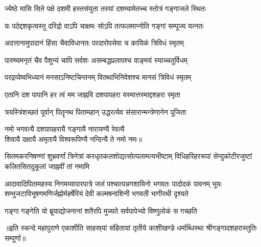 \twolineshloka
{ज्येष्ठे मासि सिते पक्षे दशमी हस्तसंयुता}%
{तस्यां दशम्यामेतच्च स्तोत्रं गङ्गाजले स्थितः}

\twolineshloka
{यः पठेद्दशकृत्वस्तु दरिद्रो वाऽपि चाक्षमः}%
{सोऽपि तत्फलमाप्नोति गङ्गां सम्पूज्य यत्नतः}

\twolineshloka
{अदत्तानामुपादानं हिंसा चैवाविधानतः}%
{परदारोपसेवा च कायिकं त्रिविधं स्मृतम्}

\twolineshloka
{पारुष्यमनृतं चैव पैशुन्यं चापि सर्वशः}%
{असम्बद्धप्रलापश्च वाङ्मयं स्याच्चतुर्विधम्}

\twolineshloka
{परद्रव्येष्वभिध्यानं मनसाऽनिष्टचिन्तनम्}%
{वितथाभिनिवेशश्च मानसं त्रिविधं स्मृतम्}

\twolineshloka
{एतानि दश पापानि हर त्वं मम जाह्नवि}%
{दशपापहरा यस्मात्तस्माद्दशहरा स्मृता}

\twolineshloka
{त्रयस्त्रिंशच्छतं पूर्वान् पितॄनथ पितामहान्}%
{उद्धरत्येव संसारान्मन्त्रेणानेन पूजिता}%


{नमो भगवत्यै दशपापहरायै गङ्गायै नारायण्यै रेवत्यै}\\
{शिवायै दक्षायै अमृतायै विश्वरूपिण्यै नन्दिन्यै ते नमो नमः॥}%

\fourlineindentedshloka
{सितमकरनिषण्णां शुभ्रवर्णां त्रिनेत्रां}
{करधृतकलशोद्यत्सोत्पलामत्यभीष्टाम्}%
{विधिहरिहररूपां सेन्दुकोटीरजुष्टां}
{कलितसितदुकूलां जाह्नवीं तां नमामि}%

\fourlineindentedshloka
{आदावादिपितामहस्य निगमव्यापारपात्रे जलं}
        {पश्चात्पन्नगशायिनो भगवतः पादोदकं पावनम्}
{भूयः शम्भुजटाविभूषणमणिर्जह्नोर्महर्षेरियं}
        {देवी कल्मषनाशिनी भगवती भागीरथी दृश्यते}  %

\twolineshloka
{गङ्गा गङ्गेति यो ब्रूयाद्योजनानां शतैरपि}
{मुच्यते सर्वपापेभ्यो विष्णुलोकं स गच्छति}%

॥इति स्कन्दे महापुराणे एकाशीति साहस्र्यां संहितायां तृतीये काशीखण्डे
धर्माब्धिस्था श्रीगङ्गादशहरास्तुतिः सम्पूर्णा॥